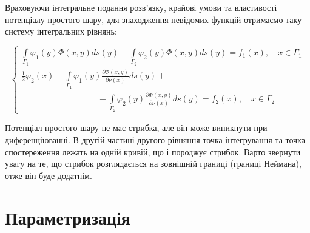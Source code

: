\documentclass[14pt,a4paper]{extarticle}
\newcounter{e}
\numberwithin{equation}{section}
\numberwithin{figure}{section}
\newcommand{\intl}{\int\limits}
\begin{document}
 Враховуючи інтегральне подання розв'язку, крайові умови та властивості потенціалу простого шару, для знаходження невідомих функцій отримаємо таку систему інтегральних рівнянь:
 
 \begin{equation}
 	\label{IE-system}
	 \left\{
	 \begin{array}{l}
	 	\displaystyle
	 	  \intl_{\Gamma_{1}} \varphi_1(y) \Phi(x, y) d s(y)
	 	+ \intl_{\Gamma_{2}} \varphi_2(y) \Phi(x, y) d s(y)
	 	= f_{1}(x), \quad x \in \Gamma_{1} 
	 	\\ [1cm]
	 	\displaystyle
	 	\frac{1}{2}\varphi_2(x)
	 	+ \intl_{\Gamma_{1}} \varphi_1(y) \frac{\partial \Phi(x, y)}{\partial \nu(x)} d s(y) +
	 	\\ [0.3cm]
	 	\displaystyle \qquad \qquad \qquad \qquad \quad
	 	+ \intl_{\Gamma_{2}} \varphi_2(y) \frac{\partial \Phi(x, y)}{\partial \nu(x)} d s(y)
	 	= f_{2}(x), \quad x \in \Gamma_{2}
 \end{array}\right.
 \end{equation}

 Потенціал простого шару не має стрибка, але він може виникнути при диференціюванні. В другій частині другого рівняння точка інтегрування та точка спостереження лежать на одній кривій, що і породжує стрибок. Варто звернути увагу на те, що стрибок розглядається на зовнішній границі (границі Неймана), отже він буде додатнім.
 

  
 \newpage
 \thispagestyle{empty}
 \section{Параметризація}
\end{document}
